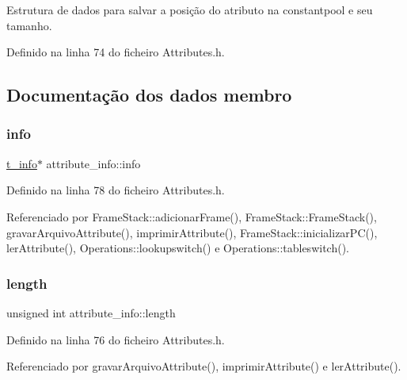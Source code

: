 Estrutura de dados para salvar a posição do atributo na constantpool e seu tamanho. 

Definido na linha 74 do ficheiro Attributes.\+h.



\subsection{Documentação dos dados membro}
\mbox{\label{structattribute__info_af3007a2d07cad3057fc835fdc7b2b774}} 
\subsubsection{\texorpdfstring{info}{info}}
{\footnotesize\ttfamily \hyperlink{uniont__info}{t\+\_\+info}$\ast$ attribute\+\_\+info\+::info}



Definido na linha 78 do ficheiro Attributes.\+h.



Referenciado por Frame\+Stack\+::adicionar\+Frame(), Frame\+Stack\+::\+Frame\+Stack(), gravar\+Arquivo\+Attribute(), imprimir\+Attribute(), Frame\+Stack\+::inicializar\+P\+C(), ler\+Attribute(), Operations\+::lookupswitch() e Operations\+::tableswitch().

\mbox{\label{structattribute__info_aa2b93ad2b4c621ba81208b0985cd3366}} 
\subsubsection{\texorpdfstring{length}{length}}
{\footnotesize\ttfamily unsigned int attribute\+\_\+info\+::length}



Definido na linha 76 do ficheiro Attributes.\+h.



Referenciado por gravar\+Arquivo\+Attribute(), imprimir\+Attribute() e ler\+Attribute().

\mbox{\label{structattribute__info_ac90a7f38d57c03dd9b213a4191fdfe0f}} 
